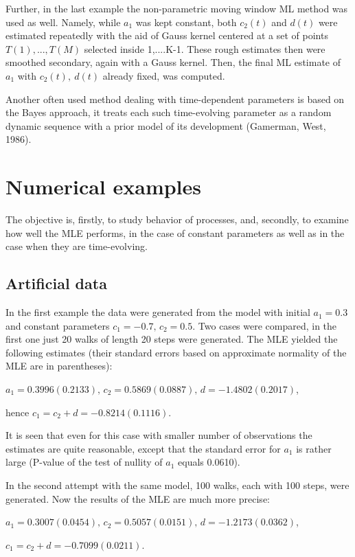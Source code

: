 \documentclass[11pt]{article}
\begin{document}
Further, in the last example the non-parametric moving window ML method was used as well.
Namely, while $a_1$ was kept constant, both $c_2(t)$ and $d(t)$ were estimated repeatedly
with the aid of Gauss kernel centered  at a set of points $T(1),...,T(M)$ selected inside 1,....K-1.
These rough estimates then were smoothed secondary, again with a Gauss kernel. Then, the final
ML estimate of $a_1$ with $c_2(t),\ d(t)$ already fixed, was computed.

Another often used method dealing with time-dependent parameters
is based on the Bayes approach, it treats each such time-evolving
parameter as a random dynamic sequence with a prior model of its
development (Gamerman, West, 1986).

\section{Numerical examples}

The objective is, firstly, to study behavior of processes, and,
secondly, to examine how well the MLE performs, in the case of
constant parameters as well as in the case when they are
time-evolving.

\subsection{Artificial data}

In the first example the data were generated from the model with
initial $a_1=0.3$ and constant parameters $c_1=-0.7,\,c_2=0.5$.
Two cases were compared, in the first one just 20 walks of length
20 steps were generated. The MLE yielded the following estimates
(their standard errors based on approximate normality of the MLE are in
parentheses):

$a_1=0.3996 (0.2133),\,c_2=0.5869 (0.0887),\, d=-1.4802 (0.2017)$,

hence $c_1=c_2+d= -0.8214 (0.1116).$

It is seen that even for this case with smaller number of
observations the estimates are quite reasonable, except that the
standard error for $a_1$ is rather large (P-value of the test of
nullity of $a_1$ equals 0.0610).

In the second attempt with the same model, 100 walks, each with
100 steps, were generated. Now the results of the MLE are much
more precise:

$a_1=0.3007 (0.0454),\,c_2=0.5057 (0.0151),\, d=-1.2173 (0.0362)$,

 $c_1=c_2+d= -0.7099 (0.0211).$
\end{document}
